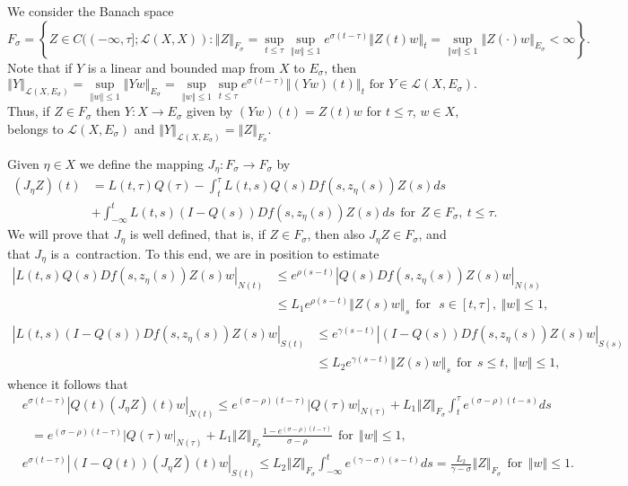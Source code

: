 \documentclass[a4paper,11pt,reqno]{amsart}
\theoremstyle{plain}
\theoremstyle{definition}
\numberwithin{equation}{section}
\newcommand{\norm}[1]{\left\Vert#1\right\Vert}
\renewcommand{\leq}{\leqslant}
\begin{document}
We consider the Banach space 
$$F_{\sigma}=\left\{Z\in C((-\infty,\tau];\mathcal{L}(X,X))\colon \norm{Z}_{F_{\sigma}}=\sup_{t\leq\tau}\sup_{\norm{w}\leq 1}e^{\sigma(t-\tau)}\norm{Z(t)w}_{t}=\sup_{\norm{w}\leq 1}\norm{Z(\cdot)w}_{E_\sigma}<\infty\right\}.$$
Note that if $Y$ is a linear and bounded map from $X$ to $E_\sigma$, then
$$\norm{Y}_{\mathcal{L}(X,E_\sigma)}=
\sup_{\norm{w}\leq 1}\norm{Yw}_{E_\sigma}=
\sup_{\norm{w}\leq 1}\sup_{t\leq\tau}e^{\sigma(t-\tau)}\norm{(Yw)(t)}_{t}\text{ for }Y\in \mathcal{L}(X,E_\sigma).$$
Thus, if $Z\in F_\sigma$ then $Y\colon X\to E_\sigma$ given by $(Yw)(t)=Z(t)w$ for $t\leq\tau$, $w\in X$, belongs to $\mathcal{L}(X,E_\sigma)$ and $\norm{Y}_{\mathcal{L}(X,E_\sigma)}=\norm{Z}_{F_\sigma}$.

Given $\eta\in X$  we define the mapping $J_\eta\colon F_\sigma\to F_\sigma$ by
\begin{equation*}%
\begin{split}
(J_{\eta}Z)(t)&=L(t,\tau)Q(\tau)-\int_{t}^{\tau}L(t,s)Q(s)Df(s,z_\eta(s))Z(s)ds\\
&+\int_{-\infty}^{t}L(t,s)(I-Q(s))Df(s,z_\eta(s))Z(s)ds\ \ \text{for}\ \   Z\in F_\sigma,\ t\leq\tau.
\end{split}
\end{equation*}
We will prove that $J_\eta$ is well defined, that is, if $Z\in F_\sigma$, then also $J_\eta Z \in F_\sigma$, and that $J_\eta$ is a~contraction. 
To this end, we are in position to estimate
\begin{equation*}
\begin{split} 
|L(t,s)Q(s)Df(s,z_\eta(s))Z(s)w|_{N(t)}&\leq e^{\rho(s-t)}|Q(s)Df(s,z_\eta(s))Z(s)w|_{N(s)}\\
&\leq L_1 e^{\rho(s-t)}\norm{Z(s)w}_{s}\ \ \text{for}\ \ \ s\in[t,\tau],\ \norm{w}\leq 1,\\
\end{split} 
\end{equation*}
\begin{equation*}
\begin{split}
|L(t,s)(I-Q(s))Df(s,z_\eta(s))Z(s)w|_{S(t)}&\leq e^{\gamma(s-t)}|(I-Q(s))Df(s,z_\eta(s))Z(s)w|_{S(s)}\\
&\leq L_2 e^{\gamma(s-t)}\norm{Z(s)w}_{s}\ \ \text{for}\ \  s\leq t,\ \norm{w}\leq 1,
\end{split}
\end{equation*}
whence it follows that
\begin{align*}
&	e^{\sigma(t-\tau)}|Q(t)(J_\eta Z)(t)w|_{N(t)}\leq e^{(\sigma-\rho)(t-\tau)}|Q(\tau)w|_{N(\tau)}+L_1\norm{Z}_{F_\sigma}\int_{t}^{\tau}e^{(\sigma-\rho)(t-s)}ds\\
& \ \ \ =e^{(\sigma-\rho)(t-\tau)}|Q(\tau)w|_{N(\tau)}+L_1\norm{Z}_{F_\sigma}\frac{1-e^{(\sigma-\rho)(t-\tau)}}{\sigma-\rho}\ \ \text{for}\ \ \norm{w}\leq 1,\\
& e^{\sigma(t-\tau)}|(I-Q(t))(J_\eta Z)(t)w|_{S(t)}\leq L_2\norm{Z}_{F_\sigma}\int_{-\infty}^{t}e^{(\gamma-\sigma)(s-t)}ds=\frac{L_2}{\gamma-\sigma}\norm{Z}_{F_\sigma}\ \ \text{for}\ \ \norm{w}\leq 1.
\end{align*}
\end{document}
